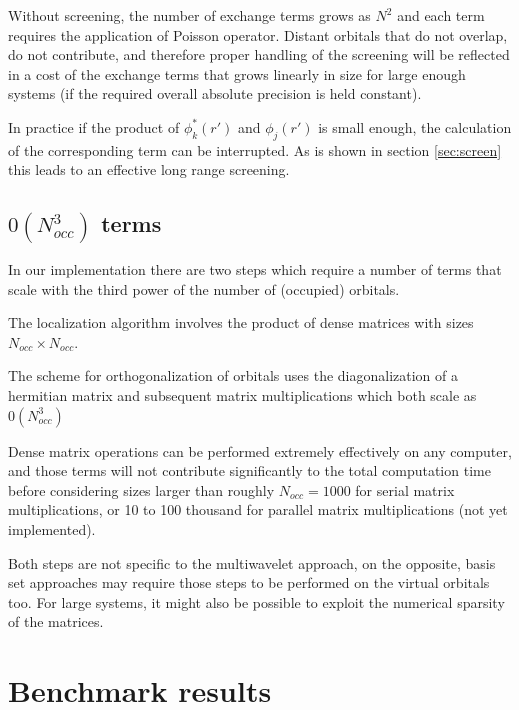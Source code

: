 \documentclass[%
 aip,
 amsmath,amssymb,
 reprint,%
]{revtex4-1}
\begin{document}
Without screening, the number of exchange terms grows as $N^2$ and each term requires the application of Poisson operator. Distant orbitals that do not overlap, do not contribute, and therefore proper handling of the screening will be reflected in a cost of the exchange terms that grows linearly in size for large enough systems (if the required overall absolute precision is held constant). 

In practice if the product of $\phi^*_k(r')$ and $\phi_j(r')$ is small enough, the calculation of the corresponding term can be interrupted. As is shown in section \ref{sec:screen} this leads to an effective long range screening.


\subsection{$0(N_{occ}^3)$ terms}

In our implementation there are two steps which require a number of terms that scale with the third power of the number of (occupied) orbitals. 

The localization algorithm involves the product of dense matrices with sizes $N_{occ} \times N_{occ}$. 

The scheme for orthogonalization of orbitals uses the diagonalization of a hermitian matrix and subsequent matrix multiplications which both scale as $0(N_{occ}^3)$

Dense matrix operations can be performed extremely effectively on any computer, and those terms will not contribute significantly to the total computation time before considering sizes larger than roughly $N_{occ}=1000$ for serial matrix multiplications, or 10 to 100 thousand for parallel matrix multiplications (not yet implemented). 

Both steps are not specific to the multiwavelet approach, on the opposite, basis set approaches may require those steps to be performed on the virtual orbitals too. For large systems, it might also be possible to exploit the numerical sparsity of the matrices.


\section{Benchmark results}
\end{document}
